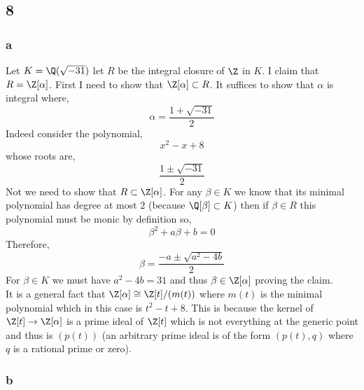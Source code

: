 \documentclass[12pt]{article}
\begin{document}
\subsection{8}

\subsubsection{a}

Let $K = \Q(\sqrt{-31})$ let $R$ be the integral closure of $\Z$ in $K$. I claim that $R = \Z[\alpha]$. First I need to show that $\Z[\alpha] \subset R$. It suffices to show that $\alpha$ is integral where,
\[ \alpha = \frac{1 + \sqrt{-31}}{2} \]
Indeed consider the polynomial,
\[ x^2 - x + 8 \]
whose roots are,
\[ \frac{1 \pm \sqrt{-31}}{2} \]
Not we need to show that $R \subset \Z[\alpha]$. For any $\beta \in K$ we know that its minimal polynomial has degree at most $2$ (because $\Q[\beta] \subset K$) then if $\beta \in R$ this polynomial must be monic by definition so,
\[ \beta^2 + a \beta + b = 0 \]
Therefore,
\[ \beta = \frac{-a \pm \sqrt{a^2 - 4b}}{2} \]
For $\beta \in K$ we must have $a^2 - 4b = 31$ and thus $\beta \in \Z[\alpha]$ proving the claim.
\bigskip\\
It is a general fact that $\Z[\alpha] \cong \Z[t]/(m(t))$ where $m(t)$ is the minimal polynomial which in this case is $t^2 - t + 8$. This is because the kernel of $\Z[t] \to \Z[\alpha]$ is a prime ideal of $\Z[t]$ which is not everything at the generic point and thus is $(p(t))$ (an arbitrary prime ideal is of the form $(p(t), q)$ where $q$ is a rational prime or zero).  

\subsubsection{b}
\end{document}
